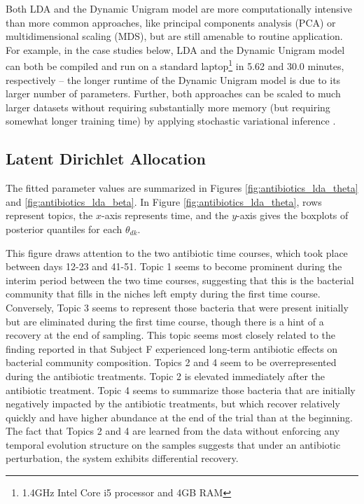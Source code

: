 \documentclass[oupdraft]{bio}
\begin{document}
Both LDA and the Dynamic Unigram model are more computationally intensive than
more common approaches, like principal components analysis (PCA) or
multidimensional scaling (MDS), but are still amenable to routine application.
For example, in the case studies below, LDA and the Dynamic Unigram model can
both be compiled and run on a standard laptop\footnote{1.4GHz Intel Core i5
  processor and 4GB RAM} in 5.62 and 30.0 minutes, respectively -- the longer
runtime of the Dynamic Unigram model is due to its larger number of parameters.
Further, both approaches can be scaled to much larger datasets without requiring
substantially more memory (but requiring somewhat longer training time) by
applying stochastic variational inference \citep{hoffman2013stochastic}.

\subsection{Latent Dirichlet Allocation}
\label{sec:antibiotics_lda}

The fitted parameter values are summarized in Figures
\ref{fig:antibiotics_lda_theta} and \ref{fig:antibiotics_lda_beta}.
In Figure \ref{fig:antibiotics_lda_theta}, rows represent topics, the $x$-axis
represents time, and the $y$-axis gives the boxplots of posterior quantiles for
each $\theta_{dk}$.

This figure draws attention to the two antibiotic time courses, which took place
between days 12-23 and 41-51. Topic 1 seems to become prominent during the
interim period between the two time courses, suggesting that this is the
bacterial community that fills in the niches left empty during the first time
course. Conversely, Topic 3 seems to represent those bacteria that were present
initially but are eliminated during the first time course, though there is a
hint of a recovery at the end of sampling. This topic seems most closely related
to the finding reported in \cite{dethlefsen2011incomplete} that Subject F
experienced long-term antibiotic effects on bacterial community composition.
Topics 2 and 4 seem to be overrepresented during the antibiotic treatments.
Topic 2 is elevated immediately after the antibiotic treatment. Topic 4 seems to
summarize those bacteria that are initially negatively impacted by the
antibiotic treatments, but which recover relatively quickly and have higher
abundance at the end of the trial than at the beginning. The fact that Topics 2
and 4 are learned from the data without enforcing any temporal evolution
structure on the samples suggests that under an antibiotic perturbation, the
system exhibits differential recovery.
\end{document}
